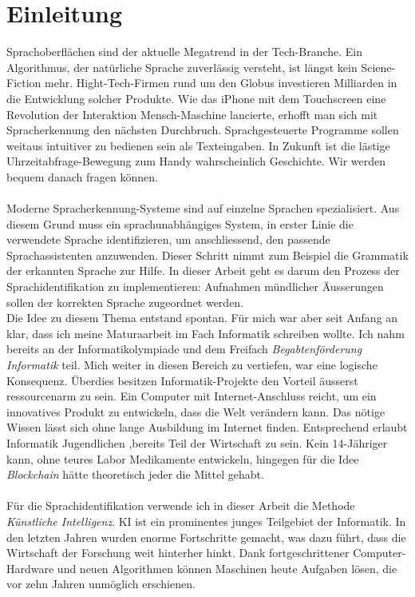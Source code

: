 \section{Einleitung}
Sprachoberflächen sind der aktuelle Megatrend in der Tech-Branche. Ein Algorithmus, der natürliche Sprache zuverlässig versteht, ist längst kein Sciene-Fiction mehr. Hight-Tech-Firmen rund um den Globus investieren Milliarden in die Entwicklung solcher Produkte. Wie das iPhone mit dem Touchscreen eine Revolution der Interaktion Mensch-Maschine lancierte, erhofft man sich mit Spracherkennung den nächsten Durchbruch. Sprachgesteuerte Programme sollen weitaus intuitiver zu bedienen sein als Texteingaben. In Zukunft ist die lästige Uhrzeitabfrage-Bewegung zum Handy wahrscheinlich Geschichte. Wir werden bequem danach fragen können.
\\ \\
Moderne Spracherkennung-Systeme sind auf einzelne Sprachen spezialisiert. Aus diesem Grund muss ein sprachunabhängiges System, in erster Linie die verwendete Sprache identifizieren, um anschliessend, den passende Sprachassistenten anzuwenden. Dieser Schritt nimmt zum Beispiel die Grammatik der erkannten Sprache zur Hilfe. In dieser Arbeit geht es darum den Prozess der Sprachidentifikation zu implementieren:  Aufnahmen mündlicher Äusserungen sollen der korrekten Sprache zugeordnet werden. 
\\ 
Die Idee zu diesem Thema entstand spontan. Für mich war aber seit Anfang an klar, dass ich meine Maturaarbeit im Fach Informatik schreiben wollte. Ich nahm bereits an der Informatikolympiade und dem Freifach \textit{Begabtenförderung Informatik} teil. Mich weiter in diesen Bereich zu vertiefen, war eine logische Konsequenz. Überdies besitzen Informatik-Projekte den Vorteil äusserst ressourcenarm zu sein. Ein Computer mit Internet-Anschluss reicht, um ein innovatives Produkt zu entwickeln, dass die Welt verändern kann. Das nötige Wissen lässt sich ohne lange Ausbildung im Internet finden. Entsprechend erlaubt Informatik Jugendlichen ,bereits Teil der Wirtschaft zu sein. Kein 14-Jähriger kann, ohne teures Labor Medikamente entwickeln, hingegen für die Idee \textit{Blockchain} hätte theoretisch jeder die Mittel gehabt.
\\ \\
Für die Sprachidentifikation verwende ich in dieser Arbeit die Methode \textit{Künstliche Intelligenz}. KI ist ein prominentes junges Teilgebiet der Informatik. In den letzten Jahren wurden enorme Fortschritte gemacht, was dazu führt, dass die Wirtschaft der Forschung weit hinterher hinkt. Dank fortgeschrittener Computer-Hardware und neuen Algorithmen können Maschinen heute Aufgaben lösen, die vor zehn Jahren unmöglich erschienen.

